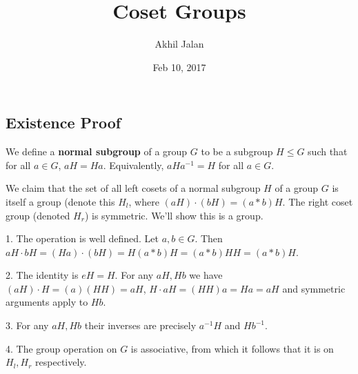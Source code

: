 \documentclass[letterpaper]{article} %
\newcommand{\prob}{\subsection*}
\begin{document}
\title{Coset Groups}
\author{Akhil Jalan}
\date{Feb 10, 2017}
\maketitle

\prob{Existence Proof}

We define a \textbf{normal subgroup} of a group $G$ to be a subgroup $H \leq G$ such that for all $a \in G$, $aH = Ha$. Equivalently, $aHa^{-1} = H$ for all $a \in G$. 

We claim that the set of all left cosets of a normal subgroup $H$ of a group $G$ is itself a group (denote this $H_{l}$, where $(aH) \cdot (bH) = (a * b)H$. The right coset group (denoted $H_{r}$) is symmetric. We'll show this is a group. 

1. The operation is well defined. Let $a, b \in G$. Then $aH \cdot bH = (Ha) \cdot (bH) = H(a * b)H = (a*b)HH = (a*b) H$. 

2. The identity is $eH = H$. For any $aH, Hb$ we have $(aH) \cdot H = (a)(HH) = aH$, $H \cdot aH = (HH)a = Ha = aH$ and symmetric arguments apply to $Hb$. 

3. For any $aH, Hb$ their inverses are precisely $a^{-1}H$ and $Hb^{-1}$. 

4. The group operation on $G$ is associative, from which it follows that it is on $H_l, H_r$ respectively. 
\end{document}
